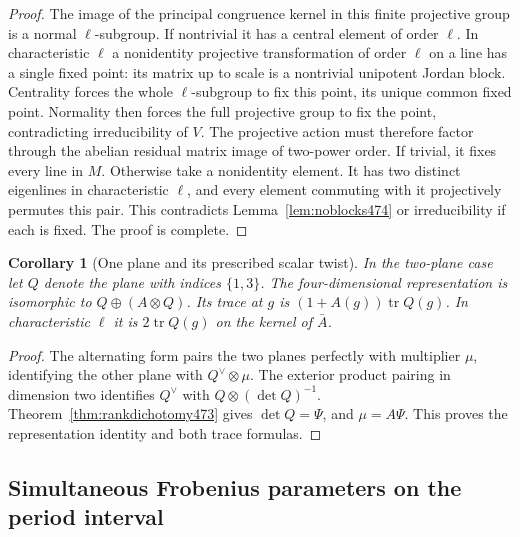 \documentclass[a4paper,11pt]{article}
\newtheorem{corollary}[proposition]{Corollary}
\theoremstyle{definition}
\theoremstyle{remark}
\numberwithin{equation}{section}
\begin{document}
\begin{proof}
The image of the principal congruence kernel in this finite
projective group is a normal \(\ell\)-subgroup. If nontrivial
it has a central element of order \(\ell\). In characteristic
\(\ell\) a nonidentity projective transformation of order \(\ell\)
on a line has a single fixed point: its matrix up to scale is a
nontrivial unipotent Jordan block. Centrality forces the whole
\(\ell\)-subgroup to fix this point, its unique common fixed
point. Normality then forces the full projective group to fix
the point, contradicting irreducibility of \(V\). The projective
action must therefore factor through the abelian residual matrix
image of two-power order. If trivial, it fixes every line in
\(M\). Otherwise take a nonidentity element. It has two distinct
eigenlines in characteristic \(\ell\), and every element commuting
with it projectively permutes this pair. This contradicts
Lemma~\ref{lem:noblocks474} or irreducibility if each is fixed.
The proof is complete.
\end{proof}

\begin{corollary}[One plane and its prescribed scalar twist]\leavevmode
\label{cor:twoplane474}
In the two-plane case let \(Q\) denote the plane with indices
\(\{1,3\}\). The four-dimensional representation is isomorphic to
\(Q\oplus(A\otimes Q)\). Its trace at \(g\) is
\((1+A(g))\operatorname{tr}Q(g)\). In characteristic \(\ell\)
it is \(2\operatorname{tr}Q(g)\) on the kernel of \(\bar A\).
\end{corollary}
\begin{proof}
The alternating form pairs the two planes perfectly with multiplier
\(\mu\), identifying the other plane with \(Q^\vee\otimes\mu\).
The exterior product pairing in dimension two identifies
\(Q^\vee\) with \(Q\otimes(\det Q)^{-1}\).
Theorem~\ref{thm:rankdichotomy473} gives \(\det Q=\Psi\),
and \(\mu=A\Psi\). This proves the representation identity
and both trace formulas.
\end{proof}


\subsection{Simultaneous Frobenius parameters on the period interval}
\label{sec:splitparameters475}
\end{document}
